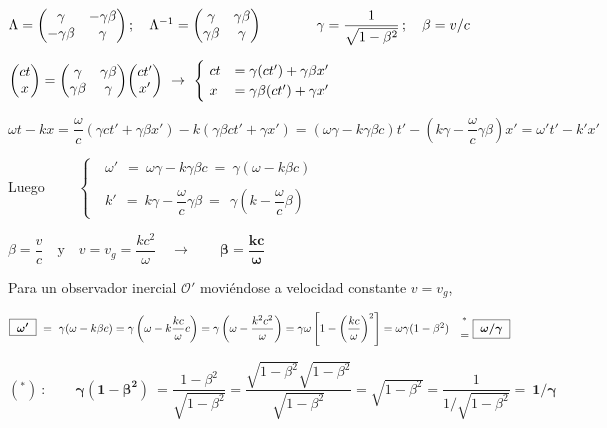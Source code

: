 $\Lambda=\mqty(\gamma&-\gamma \beta\\-\gamma \beta& \gamma)\, ; \quad \Lambda^{-1}=\mqty(\gamma&\gamma \beta\\ \gamma \beta& \gamma) \qquad \qquad \gamma=\dfrac 1 {\sqrt{1-\beta^2}}\, ; \quad \beta=v/c$

$\mqty(ct\\x) = \mqty(\gamma&\gamma \beta\\ \gamma \beta& \gamma) \mqty(ct'\\x') \ \to \ \begin{cases} \ ct&=\gamma(ct')+\gamma \beta x' \\ \ x&=\gamma \beta (ct') + \gamma x' \end{cases}$

$\omega t - kx = \dfrac \omega c (\gamma ct'+\gamma \beta x') - k (\gamma \beta c t' + \gamma x') = (\omega \gamma - k \gamma \beta c) t' - \left(k\gamma -\dfrac \omega c \gamma \beta \right) x'=\omega' t' - k' x'$

Luego $\qquad \begin{cases} \ \ \boxed{\ \omega'\  } \ = \ \omega \gamma - k \gamma \beta c \ = \boxed{ \ \gamma (\omega -k\beta c) \ } \\ \\
  \ \ \boxed{\ k' \  } \ =  \ k\gamma - \dfrac \omega c \gamma \beta \ = \ \boxed{ \ \gamma \left( k -\dfrac \omega c \beta \right) \ } \end{cases}$ 	

\vspace{5mm}

$\beta=\dfrac v c \quad \text{y} \quad v=v_g=\dfrac{kc^2}{\omega} \quad \to \qquad \boldsymbol{ \beta = \dfrac{kc}{\omega}}$

Para un observador inercial $\mathcal O'$ moviéndose a velocidad constante $v=v_g$,

$\boxed{\boldsymbol{\ \omega' \ }}\ = \ \gamma (\omega-k\beta c)=\gamma \left(\omega - k \dfrac{kc}{\omega} c \right) = \gamma \left( \omega - \dfrac{k^2c^2}{\omega}\right) = \gamma \omega \left[ 1- \left( \dfrac{kc}{\omega} \right)^2 \right] = \omega \gamma (1-\beta^2) \ \ \ \mqty{ ^* \\ = } \ \boxed{ \boldsymbol{ \  \omega/\gamma \ }}$ 


\color{blue!50}
$(^*)\ :  \qquad  \boldsymbol{ \gamma (1-\beta^2) }\  = \dfrac {1-\beta^2}{\sqrt{1-\beta^2}}= 
\dfrac{\sqrt{1-\beta^2} \sqrt{1-\beta^2}}{\sqrt{1-\beta^2}}=\sqrt{1-\beta^2}= \dfrac 1{1/\sqrt{1-\beta^2}}=\ \boldsymbol{ 1/\gamma}$

